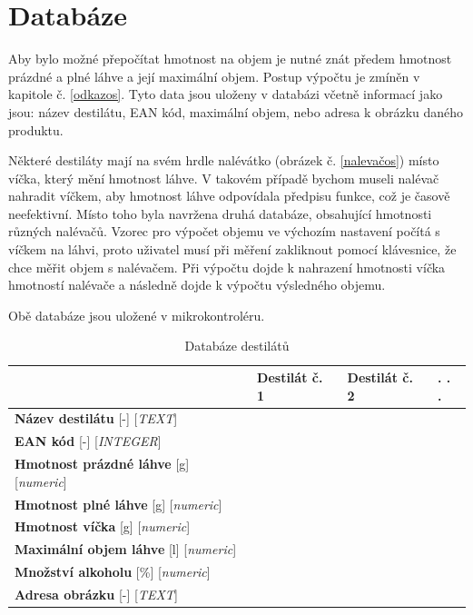 \section{Databáze}
\label{databaze}
Aby bylo možné přepočítat hmotnost na objem je nutné znát předem hmotnost prázdné a plné láhve a její maximální objem. Postup výpočtu je zmíněn v kapitole č. \ref{odkazos}. Tyto data jsou uloženy v databázi včetně informací jako jsou: název destilátu, EAN kód, maximální objem, nebo adresa k obrázku daného produktu.


Některé destiláty mají na svém hrdle nalévátko (obrázek č. \ref{nalevačos}) místo víčka, který mění hmotnost láhve. V takovém případě bychom museli nalévač nahradit víčkem, aby hmotnost láhve odpovídala předpisu funkce, což je časově neefektivní. Místo toho byla navržena druhá databáze, obsahující hmotnosti různých nalévačů. Vzorec pro výpočet objemu ve výchozím nastavení počítá s víčkem na láhvi, proto uživatel musí při měření zakliknout pomocí klávesnice, že chce měřit objem s nalévačem. Při výpočtu dojde k nahrazení hmotnosti víčka hmotností nalévače a následně dojde k výpočtu výsledného objemu.

Obě databáze jsou uložené v mikrokontroléru.
\begin{table}[!h]
\centering
\begin{tabular}{|l|l|l|l|}
\hline
 & Destilát č. 1   & Destilát č. 2   &  . . . \\ \hline
\textbf{Název destilátu} [-] [\textit{TEXT}] &   &    &  \\ \hline
\textbf{EAN kód} [-] [\textit{INTEGER}]&  &    &        \\ \hline
\textbf{Hmotnost prázdné láhve} [g] [\textit{numeric}] &    &  &        \\ \hline
\textbf{Hmotnost plné láhve} [g] [\textit{numeric}] &    &    &  \\ \hline
\textbf{Hmotnost víčka} [g] [\textit{numeric}] &    &    &  \\ \hline
\textbf{Maximální objem láhve} [l] [\textit{numeric}] &    &    &  \\ \hline
\textbf{Množství alkoholu} [\%] [\textit{numeric}] &    &    &  \\ \hline
\textbf{Adresa obrázku} [-] [\textit{TEXT}] &    &    &  \\ \hline
\end{tabular}
\caption{Databáze destilátů}
\end{table}


